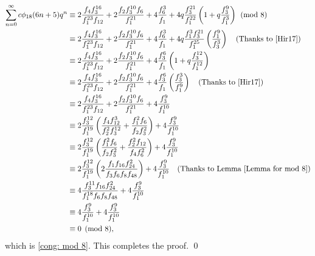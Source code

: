 \documentclass[12pt]{article}
\numberwithin{equation}{section}
\theoremstyle{plain}
\numberwithin{theorem}{section}
\theoremstyle{definition}
\theoremstyle{remark}
\begin{document}
    \begin{align*}
         \sum_{n=0}^\infty c\phi_{18}(6n+5)q^n
         &\equiv 2 \frac{f_4 f_3^{16}}{f_1^{23} f_{12}}+2 \frac{f_2f_3^{10}f_6}{f_1^{21}}+4\frac{f_6^3}{f_1}+4q \frac{f_3^{21}}{f_1^{22}}\left(1+q\frac{f_3^9}{f_1^3}\right)\pmod8\\
         &\equiv 2 \frac{f_4 f_3^{16}}{f_1^{23} f_{12}}+2 \frac{f_2f_3^{10}f_6}{f_1^{21}}+4\frac{f_6^3}{f_1}+4q\frac{f_1^3f_3^{21}}{f_1^{25}}\left(\frac{f_1^9}{f_3^3}\right) \quad\text{(Thanks to \cite[(21.3.2)]{Hir17})}\\
         &\equiv 2 \frac{f_4 f_3^{16}}{f_1^{23} f_{12}}+2 \frac{f_2f_3^{10}f_6}{f_1^{21}}+4\frac{f_3^6}{f_1}\left(1+q\frac{f_3^{12}}{f_1^{12}}\right)\\
         &\equiv 2 \frac{f_4 f_3^{16}}{f_1^{23} f_{12}}+2 \frac{f_2f_3^{10}f_6}{f_1^{21}}+4\frac{f_3^6}{f_1}\left(\frac{f_3^3}{f_1^9}\right) \quad\text{(Thanks to \cite[Sect. 22.10]{Hir17})}\\
         &\equiv 2 \frac{f_4 f_3^{16}}{f_1^{23} f_{12}}+2 \frac{f_2f_3^{10}f_6}{f_1^{21}}+4\frac{f_3^9}{f_1^{10}}\\
         &\equiv 2 \frac{f_3^{12}}{f_1^{19}}\left(\frac{f_4 f_{12}^3}{f_2^2 f_3^{12}}+\frac{f_1^2 f_6}{f_2 f_3^2}\right)+4\frac{f_3^9}{f_1^{10}}\\
         &\equiv 2 \frac{f_3^{12} }{f_1^{19}}\left(\frac{f_1^2 f_6 }{f_2 f_3^2}+\frac{f_2^2 f_{12}}{f_4 f_6^2}\right)+4\frac{f_3^9}{f_1^{10}}\\
         &\equiv 2 \frac{f_3^{12}}{f_1^{19}}\left(2\frac{f_1 f_{16} f_{24}^2}{f_3 f_6 f_8 f_{48}}\right)+4\frac{f_3^9}{f_1^{10}}\quad\text{(Thanks to Lemma \ref{Lemma for mod 8})}\\
         &\equiv 4 \frac{f_3^{11} f_{16} f_{24}^2}{f_1^{18} f_6 f_8 f_{48}}+4\frac{f_3^9}{f_1^{10}}\\
         &\equiv 4\frac{f_3^9}{f_1^{10}}+4\frac{f_3^9}{f_1^{10}}\\
         &\equiv 0\pmod8,
    \end{align*}
    which is \eqref{cong: mod 8}. This completes the proof. \qed
\end{document}
